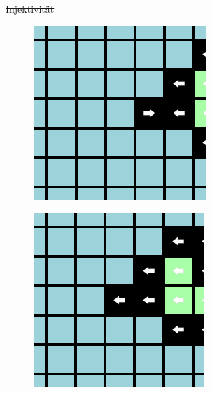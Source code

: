 \documentclass[aspectratio=169]{beamer}
\begin{document}
  \begin{frame}{\sout{Injektivität}}

    \begin{multicols*}{5}

      \begin{figure}[H]
        \centering
        \includegraphics[width = 0.35 \textheight]{example2_2.png}
      \end{figure}

      \vfill\null

      \centering{\Huge $\rightarrow$ \par}

      \vfill\null

      \begin{figure}[H]
        \centering
        \includegraphics[width = 0.35 \textheight]{example2_3.png}
      \end{figure}

      \vfill\null



      \centering{\Huge $\leftarrow$ \par}
      \vfill\null


\end{multicols*}
\end{frame}
\end{document}
